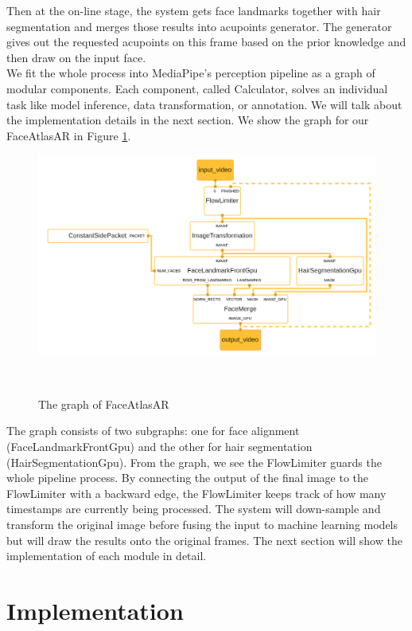 Then at the on-line stage, the system gets face landmarks together with hair segmentation and merges those results into acupoints generator. The generator gives out the requested acupoints on this frame based on the prior knowledge and then draw on the input face.\\
We fit the whole process into MediaPipe’s perception pipeline as a graph of modular components. Each component, called Calculator, solves an individual task like model inference, data transformation, or annotation. We will talk about the implementation details in the next section. We show the graph for our FaceAtlasAR in Figure  \ref{fig:graph_main}.\\
\begin{figure}
\centering
  \includegraphics[width=\columnwidth]{figures/graph_main.png}
  \caption{The graph of FaceAtlasAR}~\label{fig:graph_main}
\end{figure}
The graph consists of two subgraphs: one for face alignment (FaceLandmarkFrontGpu) and the other for hair segmentation (HairSegmentationGpu). From the graph, we see the FlowLimiter guards the whole pipeline process. By connecting the output of the final image to the FlowLimiter with a backward edge, the FlowLimiter keeps track of how many timestamps are currently being processed. The system will down-sample and transform the original image before fusing the input to machine learning models but will draw the results onto the original frames. The next section will show the implementation of each module in detail.

\section{Implementation}
\label{sec:implementation}

